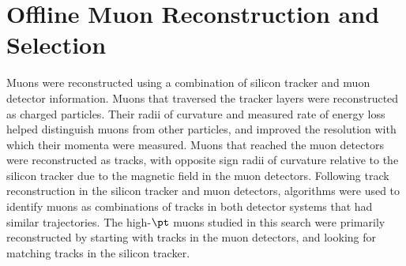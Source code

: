 \section{Offline Muon Reconstruction and Selection}
\label{sec:muonRecoAndSelection}
Muons were reconstructed using a combination of silicon tracker and muon detector information.  Muons 
that traversed the tracker layers were reconstructed as charged particles.  Their radii of curvature 
and measured rate of energy loss helped distinguish muons from other particles, and improved the 
resolution with which their momenta were measured.  Muons that reached the muon detectors were reconstructed 
as tracks, with opposite sign radii of curvature relative to the silicon tracker due to the magnetic 
field in the muon detectors.  Following track reconstruction in the silicon tracker and muon detectors, 
algorithms \cite{cmsMuonRecoRunOne} were used to identify muons as combinations of tracks in both detector 
systems that had similar trajectories.  The high-$\pt$ muons studied in this search were primarily 
reconstructed by starting with tracks in the muon detectors, and looking for matching tracks in the 
silicon tracker.


